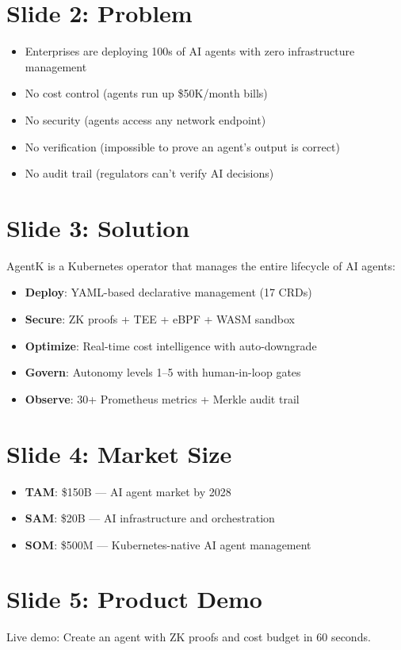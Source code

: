\documentclass[12pt,a4paper,openany]{report}
\begin{document}
\section{Slide 2: Problem}
\begin{itemize}
    \item Enterprises are deploying 100s of AI agents with zero infrastructure management
    \item No cost control (agents run up \$50K/month bills)
    \item No security (agents access any network endpoint)
    \item No verification (impossible to prove an agent's output is correct)
    \item No audit trail (regulators can't verify AI decisions)
\end{itemize}

\section{Slide 3: Solution}
AgentK is a Kubernetes operator that manages the entire lifecycle of AI agents:
\begin{itemize}
    \item \textbf{Deploy}: YAML-based declarative management (17 CRDs)
    \item \textbf{Secure}: ZK proofs + TEE + eBPF + WASM sandbox
    \item \textbf{Optimize}: Real-time cost intelligence with auto-downgrade
    \item \textbf{Govern}: Autonomy levels 1--5 with human-in-loop gates
    \item \textbf{Observe}: 30+ Prometheus metrics + Merkle audit trail
\end{itemize}

\section{Slide 4: Market Size}
\begin{itemize}
    \item \textbf{TAM}: \$150B — AI agent market by 2028
    \item \textbf{SAM}: \$20B — AI infrastructure and orchestration
    \item \textbf{SOM}: \$500M — Kubernetes-native AI agent management
\end{itemize}

\section{Slide 5: Product Demo}
Live demo: Create an agent with ZK proofs and cost budget in 60 seconds.
\end{document}
